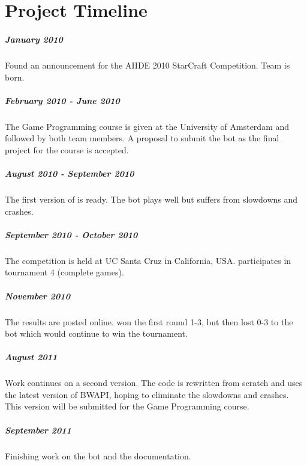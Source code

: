 
\chapter{Project Timeline}

\paragraph{January 2010}
Found an announcement for the AIIDE 2010 StarCraft Competition. Team \massexpand is born.

\paragraph{February 2010 - June 2010}
The Game Programming course is given at the University of Amsterdam and followed by both team members. A proposal to submit the bot as the final project for the course is accepted.

\paragraph{August 2010 - September 2010}
The first version of \massexpand is ready. The bot plays well but suffers from slowdowns and crashes.

\paragraph{September 2010 - October 2010}
The competition is held at UC Santa Cruz in California, USA. \massexpand participates in tournament 4 (complete games).

\paragraph{November 2010}
The results are posted online. \massexpand won the first round 1-3, but then lost 0-3 to the bot which would continue to win the tournament.

\paragraph{August 2011}
Work continues on a second version. The code is rewritten from scratch and uses the latest version of BWAPI, hoping to eliminate the slowdowns and crashes. This version will be submitted for the Game Programming course.

\paragraph{September 2011}
Finishing work on the bot and the documentation.